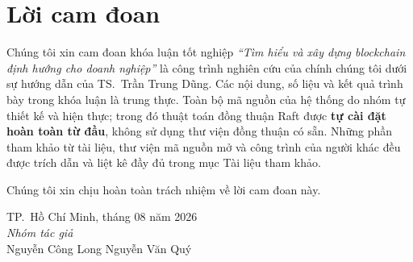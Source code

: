 \chapter*{Lời cam đoan}

Chúng tôi xin cam đoan khóa luận tốt nghiệp \textit{``Tìm hiểu và xây dựng
blockchain định hướng cho doanh nghiệp''} là công trình nghiên cứu của chính
chúng tôi dưới sự hướng dẫn của TS.~Trần Trung Dũng. Các nội dung, số liệu và
kết quả trình bày trong khóa luận là trung thực. Toàn bộ mã nguồn của hệ thống
do nhóm tự thiết kế và hiện thực; trong đó thuật toán đồng thuận Raft được
\textbf{tự cài đặt hoàn toàn từ đầu}, không sử dụng thư viện đồng thuận có sẵn.
Những phần tham khảo từ tài liệu, thư viện mã nguồn mở và công trình của người
khác đều được trích dẫn và liệt kê đầy đủ trong mục Tài liệu tham khảo.

Chúng tôi xin chịu hoàn toàn trách nhiệm về lời cam đoan này.

\vspace{1cm}
\begin{flushright}
TP.~Hồ Chí Minh, tháng 08 năm 2026\\[0.4cm]
\textit{Nhóm tác giả}\\[0.2cm]
Nguyễn Công Long \quad\quad Nguyễn Văn Quý
\end{flushright}
